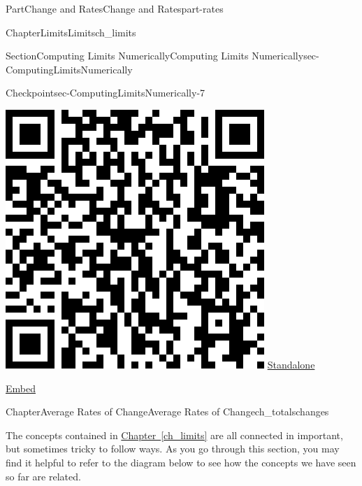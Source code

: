 \documentclass[oneside,10pt,]{tufte-book}
\newcommand{\xreffont}{\relax}
\numberwithin{equation}{chapter}
\begin{document}
\begin{partptx}{Part}{Change and Rates}{}{Change and Rates}{}{}{part-rates}
\begin{chapterptx}{Chapter}{Limits}{}{Limits}{}{}{ch_limits}
\begin{sectionptx}{Section}{Computing Limits Numerically}{}{Computing Limits Numerically}{}{}{sec-ComputingLimitsNumerically}
\begin{inlineexercise}{Checkpoint}{}{sec-ComputingLimitsNumerically-7}
\begin{sidebyside}{2}{0.075}{0.075}{0.17}
\begin{sbspanel}{0.21}
\includegraphics[width=\linewidth]{generated/qrcode/sec-ComputingLimitsNumerically-7-2-3.png}
\href{http://webwork.bridgew.edu/oer/functions_at_work/sec-ComputingLimitsNumerically-7-2-3.html}{Standalone}%
\par
\href{http://webwork.bridgew.edu/oer/functions_at_work/sec-ComputingLimitsNumerically-7-2-3-if.html}{Embed}%
\end{sbspanel}%
\end{sidebyside}%
\end{inlineexercise}%
\end{sectionptx}
\end{chapterptx}
%
\typeout{************************************************}
\typeout{************************************************}
%
\begin{chapterptx}{Chapter}{Average Rates of Change}{}{Average Rates of Change}{}{}{ch_totalschanges}
\renewcommand*{\chaptername}{Chapter}
\begin{introduction}{}%
The concepts contained in \hyperref[ch_limits]{Chapter~{\xreffont\ref{ch_limits}}\textendash{}{\xreffont\ref{ch_tangentsecant}}} are all connected in important, but sometimes tricky to follow ways.  As you go through this section, you may find it helpful to refer to the diagram below to see how the concepts we have seen so far are related.%

\end{introduction}
\end{chapterptx}
\end{partptx}
\end{document}
